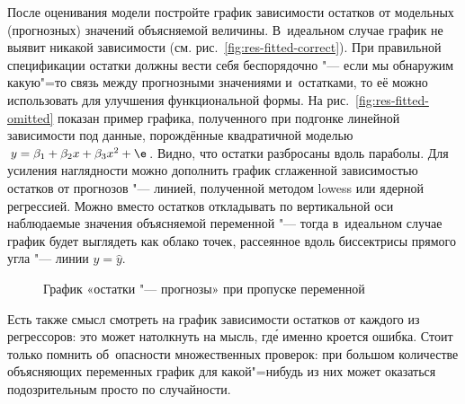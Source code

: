 \documentclass[11pt]{article}
\begin{document}
После оценивания модели постройте график зависимости остатков от модельных (прогнозных) значений объясняемой величины. В~идеальном случае график не выявит никакой зависимости (см. рис.~\ref{fig:res-fitted-correct}). При правильной спецификации остатки должны вести себя беспорядочно "--- если мы обнаружим какую"=то связь между прогнозными значениями и~остатками, то её можно использовать для улучшения функциональной формы. На рис.~\ref{fig:res-fitted-omitted} показан пример графика, полученного при подгонке линейной зависимости под данные, порождённые квадратичной моделью $y = \beta_1 + \beta_2 x + \beta_3 x^2 + \e$. Видно, что остатки разбросаны вдоль параболы. Для усиления наглядности можно дополнить график сглаженной зависимостью остатков от прогнозов "--- линией, полученной методом lowess или ядерной регрессией. Можно вместо остатков откладывать по вертикальной оси наблюдаемые значения объясняемой переменной "--- тогда в~идеальном случае график будет выглядеть как облако точек, рассеянное вдоль биссектрисы прямого угла "--- линии $y = \hat y$.

\begin{figure}[hbtp]
	\centering
	 \quad
	\caption{График «остатки "--- прогнозы» при пропуске переменной}
\end{figure}

Есть также смысл смотреть на график зависимости остатков от каждого из регрессоров: это может натолкнуть на мысль, гд\'{е} именно кроется ошибка. Стоит только помнить об~опасности множественных проверок: при большом количестве объясняющих переменных график для какой"=нибудь из них может оказаться подозрительным просто по случайности.
\end{document}
